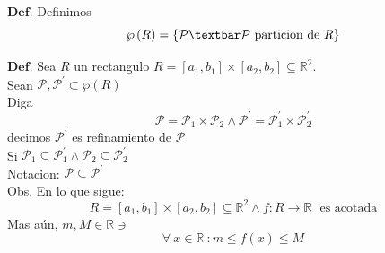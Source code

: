 \documentclass[10pt,a4paper]{article}
\begin{document}
\color{red} 
$\mathbf{Def.}$
\color{black} 
Definimos 
$$ \wp \left( R \right) = \{ \mathcal{P} \textbar \mathcal{P} \text{ particion de  } R \}  $$

\color{red} 
$\mathbf{Def.}$
\color{black} 
Sea  $R$ un rectangulo $R = \left[ a_1,b_1 \right] \times [a_2,b_2] \subseteq \mathbb{R} ^2$. \\
Sean $\mathcal{P} , \mathcal{P}^{\prime} \subset \wp \left( R \right)  $ \\
Diga  
$$ \mathcal{P} = \mathcal{P}_1 \times \mathcal{P}_2 \wedge  \mathcal{P}^{\prime} = \mathcal{P}_1^{\prime} \times 
\mathcal{P}_2^{\prime} $$
decimos $\mathcal{P}^{\prime}$ es refinamiento de $\mathcal{P}$ \\
Si $\mathcal{P}_1 \subseteq \mathcal{P}_1^{\prime} \wedge \mathcal{P}_2 \subseteq \mathcal{P}_2^{\prime}$ \\
Notacion: $\mathcal{P} \subseteq \mathcal{P}^{\prime}$ \\
\color{red} Obs. \color{black} En lo que sigue: 
$$ R = \left[ a_1, b_1 \right] \times \left[ a_2, b_2 \right]  \subseteq \mathbb{R}^2 \wedge f: R \rightarrow 
\mathbb{R} \ \ \  \text{es acotada} $$
Mas aún, $m,M \in \mathbb{R} \ni $ 
$$ \forall \ x \in \mathbb{R} \ : m \leq f \left( x \right) \leq M $$
\end{document}
